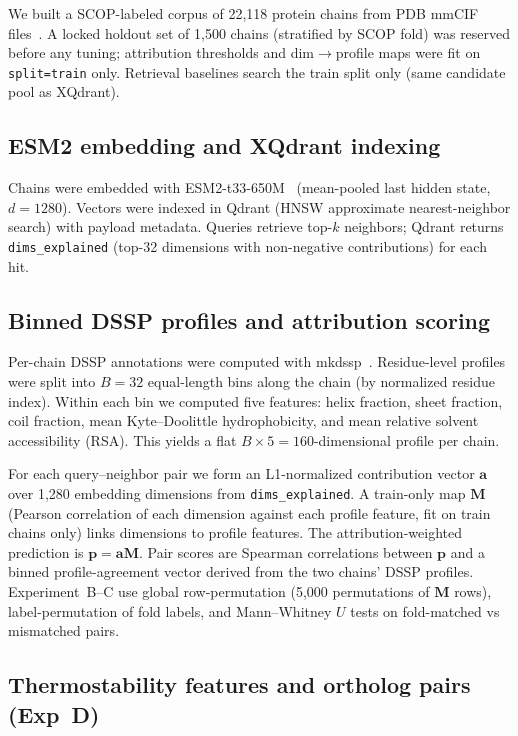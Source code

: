 \documentclass{ws-procs11x85}
\begin{document}
We built a SCOP-labeled corpus of 22,118 protein chains from PDB mmCIF files~\cite{chothia1992scop,andreeva2008scop}. A locked holdout set of 1,500 chains (stratified by SCOP fold) was reserved before any tuning; attribution thresholds and dim$\rightarrow$profile maps were fit on \texttt{split=train} only. Retrieval baselines search the train split only (same candidate pool as XQdrant).

\subsection{ESM2 embedding and XQdrant indexing}

Chains were embedded with ESM2-t33-650M~\cite{rives2021esm2} (mean-pooled last hidden state, $d=1280$). Vectors were indexed in Qdrant (HNSW approximate nearest-neighbor search) with payload metadata. Queries retrieve top-$k$ neighbors; Qdrant returns \texttt{dims\_explained} (top-32 dimensions with non-negative contributions) for each hit.

\subsection{Binned DSSP profiles and attribution scoring}

Per-chain DSSP annotations were computed with mkdssp~\cite{joosten2011dssp,kabsch1983dssp}. Residue-level profiles were split into $B=32$ equal-length bins along the chain (by normalized residue index). Within each bin we computed five features: helix fraction, sheet fraction, coil fraction, mean Kyte--Doolittle hydrophobicity, and mean relative solvent accessibility (RSA). This yields a flat $B \times 5 = 160$-dimensional profile per chain.

For each query--neighbor pair we form an L1-normalized contribution vector $\mathbf{a}$ over 1,280 embedding dimensions from \texttt{dims\_explained}. A train-only map $\mathbf{M}$ (Pearson correlation of each dimension against each profile feature, fit on train chains only) links dimensions to profile features. The attribution-weighted prediction is $\mathbf{p} = \mathbf{a}\mathbf{M}$. Pair scores are Spearman correlations between $\mathbf{p}$ and a binned profile-agreement vector derived from the two chains' DSSP profiles. Experiment~B--C use global row-permutation (5,000 permutations of $\mathbf{M}$ rows), label-permutation of fold labels, and Mann--Whitney $U$ tests on fold-matched vs mismatched pairs.

\subsection{Thermostability features and ortholog pairs (Exp~D)}
\end{document}
